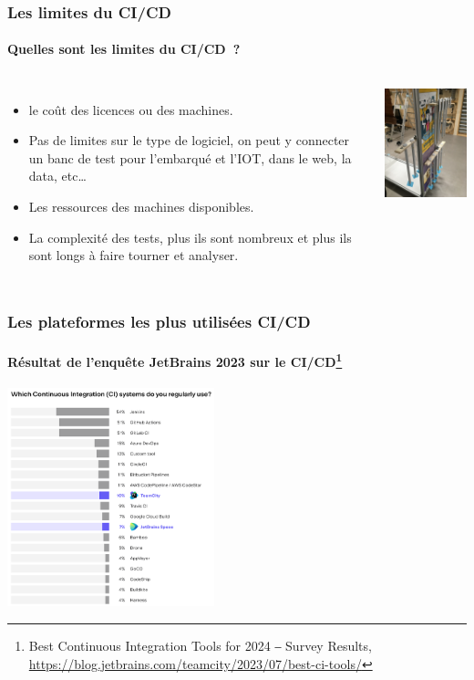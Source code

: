 \documentclass{beamer}
\begin{document}
    \begin{frame}
        \frametitle{Les limites du CI/CD}
        \framesubtitle{Quelles sont les limites du CI/CD~?}
        \transdissolve
        \pause
        \begin{columns}
            \begin{itemize}
                \item le coût des licences ou des machines.
                \item Pas de limites sur le type de logiciel, on peut y connecter un banc de test pour l'embarqué et l'IOT, dans le web, la data, etc\ldots
                \item Les ressources des machines disponibles.
                \item La complexité des tests, plus ils sont nombreux et plus ils sont longs à faire tourner et analyser.
            \end{itemize}
            \centering
            \includegraphics[width=5cm]{image/somfy-test-bench}
        \end{columns}
    \end{frame}

    \begin{frame}
        \frametitle{Les plateformes les plus utilisées CI/CD}
        \framesubtitle{Résultat de l'enquête JetBrains 2023 sur le CI/CD\footnote{Best Continuous Integration Tools for 2024 ‒ Survey Results, \url{https://blog.jetbrains.com/teamcity/2023/07/best-ci-tools/}}}
        \transdissolve
        \centering
        \includegraphics[width=6cm]{image/ci-jetbrains-survey}
    \end{frame}
\end{document}
